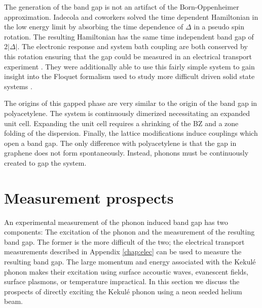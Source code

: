 The generation of the band gap is not an artifact of the Born-Oppenheimer approximation.
Iadecola and coworkers solved the time dependent Hamiltonian in the low energy limit by absorbing the time dependence of $\Delta$ in a pseudo spin rotation.
The resulting Hamiltonian has the same time independent band gap of $2 |\Delta|$.
The electronic response and system bath coupling are both conserved by this rotation ensuring that the gap could be measured in an electrical transport experiment \cite{Iadecola2013}.
They were additionally able to use this fairly simple system to gain insight into the Floquet formalism used to study more difficult driven solid state systems \cite{Iadecola2013a}.

The origins of this gapped phase are very similar to the origin of the band gap in polyacetylene.
The system is continuously dimerized necessitating an expanded unit cell.
Expanding the unit cell requires a shrinking of the BZ and a zone folding of the dispersion.
Finally, the lattice modifications induce couplings which open a band gap.
The only difference with polyacetylene is that the gap in graphene does not form spontaneously.
Instead, phonons must be continuously created to gap the system.

\section{Measurement prospects}
An experimental measurement of the phonon induced band gap has two components: The excitation of the phonon and the measurement of the resulting band gap.
The former is the more difficult of the two; the electrical transport measurements described in Appendix \ref{chap:elec} can be used to measure the resulting band gap.
The large momentum and energy associated with the Kekul\'e phonon makes their excitation using surface accoustic waves, evanescent fields, surface plasmons, or temperature impractical.
In this section we discuss the prospects of directly exciting the Kekul\'e phonon using a neon seeded helium beam.

